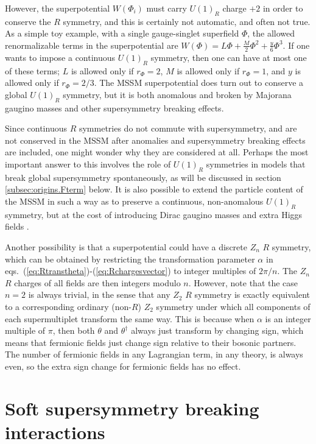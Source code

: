 \documentclass[12pt]{article}
\renewcommand{\theequation}{\arabic{section}.\arabic{equation}}
\begin{document}
However, the superpotential $W(\Phi_i)$ must carry 
$U(1)_R$ charge $+2$ in order to conserve the $R$ symmetry, 
and this is certainly not 
automatic, and often not true. As a simple toy example, 
with a single gauge-singlet superfield $\Phi$, the allowed renormalizable 
terms in the superpotential are $W(\Phi) = L \Phi + \frac{M}{2} \Phi^2 + 
\frac{y}{6} \Phi^3$. If one wants to impose a continuous $U(1)_R$ symmetry, 
then one can have at most one of these terms; $L$ is allowed only if 
$r_\Phi = 2$, $M$ is allowed only if $r_\Phi = 1$, and $y$ is allowed 
only if $r_\Phi = 2/3$. The MSSM superpotential 
does turn out to conserve a global $U(1)_R$ symmetry, but it is both anomalous
and broken by Majorana gaugino masses and other supersymmetry breaking effects.

Since continuous $R$ symmetries do not commute 
with supersymmetry, and are not conserved in the MSSM after anomalies 
and supersymmetry breaking effects are
included, one might wonder why they are considered at all. 
Perhaps the most important answer to this involves the role of $U(1)_R$ 
symmetries in models that break global supersymmetry spontaneously, as 
will be discussed in section \ref{subsec:origins.Fterm} below. 
It is also possible to extend the particle content of the MSSM in such a way as to 
preserve a continuous, non-anomalous $U(1)_R$ symmetry, 
but at the cost of introducing Dirac gaugino masses and extra Higgs 
fields \cite{Kribs:2007ac}.

Another possibility is that a superpotential could 
have a discrete $Z_n$ $R$ symmetry, which can be 
obtained by restricting the transformation parameter $\alpha$ in 
eqs.~(\ref{eq:Rtranstheta})-(\ref{eq:Rchargesvector}) to integer 
multiples of $2\pi/n$. The $Z_n$ $R$ charges of all fields are then 
integers modulo $n$. However, note that the case $n=2$ is always trivial, in the 
sense that any $Z_2$ $R$ symmetry is exactly equivalent to a 
corresponding ordinary (non-$R$) $Z_2$ symmetry under which all components of 
each supermultiplet transform the same way. This is because when $\alpha$ 
is an integer multiple of $\pi$, then both $\theta$ and $\theta^\dagger$ 
always just transform by changing sign, which means that fermionic fields just  
change sign relative to their bosonic partners. The number of fermionic fields 
in any Lagrangian term, in any theory, is always even, so the extra sign 
change for fermionic fields has no effect.

\section{Soft supersymmetry breaking interactions}\label{sec:soft}
\renewcommand{\theequation}{\arabic{section}.\arabic{equation}}
\setcounter{equation}{0}
\setcounter{figure}{0}
\setcounter{table}{0}
\setcounter{footnote}{1}
\end{document}
